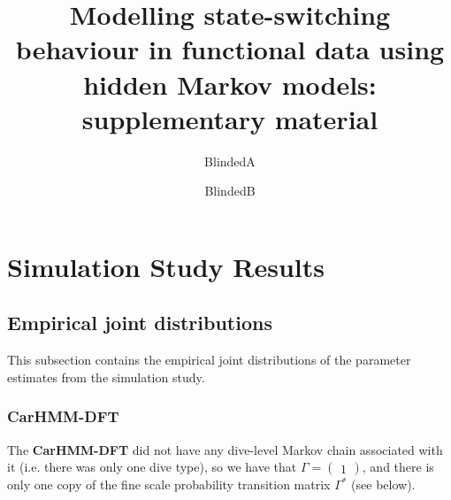 \documentclass[12pt]{TD-CJS}
\begin{document}

\renewcommand{\eqref}[1]{(\ref{#1})}
\newcommand{\mb}[1]{\mathbf{#1}}
\newcommand{\mbb}[1]{\mathbb{#1}}
\newcommand{\mt}[1]{\mathrm{#1}}
\newcommand{\rv}{random variable}
\newcommand{\newblock}{}


\title[]{Modelling state-switching behaviour in functional data using hidden Markov models: supplementary material}%
\author{BlindedA\thanksref{*}}
\author{BlindedB}


\makechaptertitle

\section{Simulation Study Results}

\subsection{Empirical joint distributions}

This subsection contains the empirical joint distributions of the parameter estimates from the simulation study.

\subsubsection{\textbf{CarHMM-DFT}}

The \textbf{CarHMM-DFT} did not have any dive-level Markov chain associated with it (i.e. there was only one dive type), so we have that $\Gamma = \begin{pmatrix} 1 \end{pmatrix}$, and there is only one copy of the fine scale probability transition matrix $\Gamma^*$ (see below).
\end{document}
